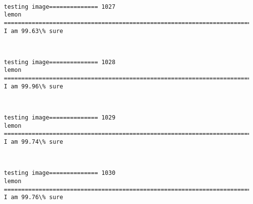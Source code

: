 \documentclass[11pt]{article}
\begin{document}
    \begin{center}
    \end{center}
    { \hspace*{\fill} \\}
    
    \begin{Verbatim}[commandchars=\\\{\}]
testing image============== 1027
lemon
============================================================================
I am 99.63\% sure

    \end{Verbatim}

    \begin{center}
    \end{center}
    { \hspace*{\fill} \\}
    
    \begin{Verbatim}[commandchars=\\\{\}]
testing image============== 1028
lemon
============================================================================
I am 99.96\% sure

    \end{Verbatim}

    \begin{center}
    \end{center}
    { \hspace*{\fill} \\}
    
    \begin{Verbatim}[commandchars=\\\{\}]
testing image============== 1029
lemon
============================================================================
I am 99.74\% sure

    \end{Verbatim}

    \begin{center}
    \end{center}
    { \hspace*{\fill} \\}
    
    \begin{Verbatim}[commandchars=\\\{\}]
testing image============== 1030
lemon
============================================================================
I am 99.76\% sure

    \end{Verbatim}
\end{document}
